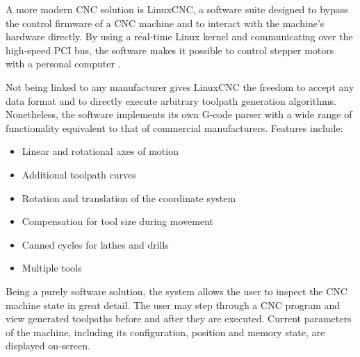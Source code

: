 A more modern CNC solution is LinuxCNC, a software suite designed to bypass the
control firmware of a CNC machine and to interact with the machine's hardware
directly. By using a real-time Linux kernel and communicating over the
high-speed PCI bus, the software makes it possible to control stepper motors
with a personal computer \cite{linuxcnc}.

Not being linked to any manufacturer gives LinuxCNC the freedom to accept any
data format and to directly execute arbitrary toolpath generation algorithms.
Nonetheless, the software implements its own G-code parser with a wide range of
functionality equivalent to that of commercial manufacturers. Features include:
\begin{itemize}
    \item Linear and rotational axes of motion
    \item Additional toolpath curves
    \item Rotation and translation of the coordinate system
    \item Compensation for tool size during movement
    \item Canned cycles for lathes and drills
    \item Multiple tools
\end{itemize}

Being a purely software solution, the system allows the user to inspect the
CNC machine state in great detail. The user may step through a CNC program and
view generated toolpaths before and after they are executed. Current parameters
of the machine, including its configuration, position and memory state, are
displayed on-screen.
